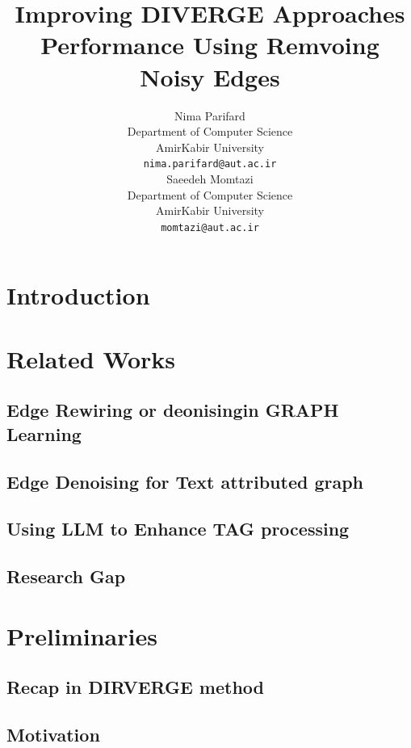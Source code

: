 \documentclass{article}
\title{Improving DIVERGE Approaches Performance Using Remvoing Noisy Edges}
\author{ Nima Parifard \\
	Department of Computer Science\\
	AmirKabir University\\
	\texttt{nima.parifard@aut.ac.ir} \\
	\And
	Saeedeh Momtazi \\
	Department of Computer Science\\
	AmirKabir University \\
	\texttt{momtazi@aut.ac.ir} \\
}
\begin{document}
\maketitle

\begin{abstract}

\end{abstract}




\section{Introduction}



\section{Related Works}

\subsection{Edge Rewiring or deonisingin GRAPH Learning}

\subsection{Edge Denoising for Text attributed graph}

\subsection{Using LLM to Enhance TAG processing}

\subsection{Research Gap}


\section{Preliminaries}
\subsection{Recap in DIRVERGE method}
\subsection{Motivation}
\end{document}
